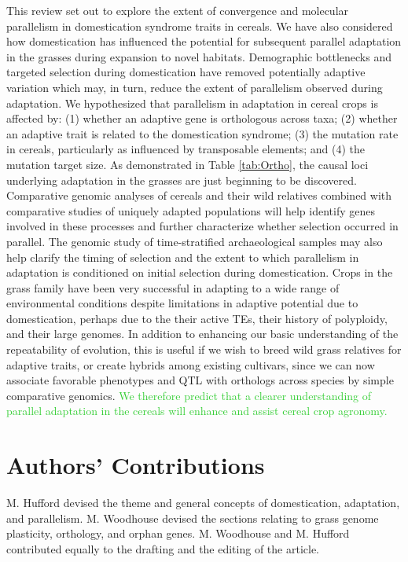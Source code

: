 \documentclass[12pt]{article}
\newcommand{\mw}[1]{\textcolor{LimeGreen}{\normalsize #1}}
\begin{document}
This review set out to explore the extent of convergence and molecular parallelism in domestication syndrome traits in cereals.
We have also considered how domestication has influenced the potential for subsequent parallel adaptation in the grasses during expansion to novel habitats. 
Demographic bottlenecks and targeted selection during domestication have removed potentially adaptive variation which may, in turn, reduce the extent of parallelism observed during adaptation.
We hypothesized that parallelism in adaptation in cereal crops is affected by:  (1) whether an adaptive gene is orthologous across taxa; (2) whether an adaptive trait is related to the domestication syndrome; (3) the mutation rate in cereals, particularly as influenced by transposable elements; and (4) the mutation target size.
As demonstrated in Table \ref{tab:Ortho}, the causal loci underlying adaptation in the grasses are just beginning to be discovered.
Comparative genomic analyses of cereals and their wild relatives combined with comparative studies of uniquely adapted populations will help identify genes involved in these processes and further characterize whether selection occurred in parallel.
The genomic study of time-stratified archaeological samples may also help clarify the timing of selection and the extent to which parallelism in adaptation is conditioned on initial selection during domestication.
Crops in the grass family have been very successful in adapting to a wide range of environmental conditions despite limitations in adaptive potential due to domestication, perhaps due to the their active TEs, their history of polyploidy, and their large genomes.
In addition to enhancing our basic understanding of the repeatability of evolution, this is useful if we wish to breed wild grass relatives for adaptive traits, or create hybrids among existing cultivars, since we can now associate favorable phenotypes and QTL with orthologs across species by simple comparative genomics. \mw{We therefore predict that a clearer understanding of parallel adaptation in the cereals will enhance and assist cereal crop agronomy.}

\section*{Authors' Contributions}
M. Hufford devised the theme and general concepts of domestication, adaptation, and parallelism. M. Woodhouse devised the sections relating to grass genome plasticity, orthology, and orphan genes. M. Woodhouse and M. Hufford contributed equally to the drafting and the editing of the article.
\end{document}
